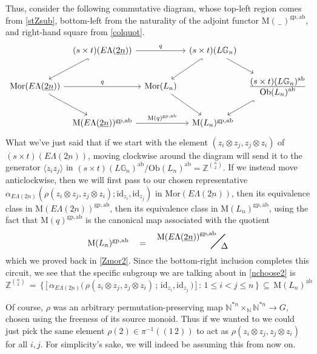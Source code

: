 \documentclass{amsbook} %
\newcommand{\bigquotient}[2]{ \raisebox{0.75\height}{$#1$} \mkern-12mu\scalebox{2}{$\diagup$}\mkern-10mu \raisebox{-0.5\height}{$#2$} }
\newcommand{\ELnn}{E\Lambda(\underline{2n})}
\numberwithin{section}{chapter}
\begin{document}
Thus, consider the following commutative diagram, whose top-left region comes from \cref{stZsub}, bottom-left from the naturality of the adjoint functor $\mathrm{M}( \, \_ \, )^{\mathrm{gp},\mathrm{ab}}$, and right-hand square from \cref{colquot}.
\[ \begin{tikzcd}[column sep=tiny] 
& (s \times t)(\ELnn) \ar[dl, hookrightarrow] \ar[rr, "q"] & & (s \times t)(L\mathbb{G}_{n}) \ar[dl, hookrightarrow] \ar[dr] & \\
\mathrm{Mor}(\ELnn) \ar[rr, "q"] \ar[dr] & & \mathrm{Mor}(L_n) \ar[dr] & & \frac{\displaystyle (s \times t)(L\mathbb{G}_{n})^{\mathrm{ab}}}{\displaystyle \mathrm{Ob}(L_n)^{\mathrm{ab}}} \ar[dl, hookrightarrow] \\
& \mathrm{M}(\ELnn)^{\mathrm{gp},\mathrm{ab}} \ar[rr, "\mathrm{M}(q)^{\mathrm{gp},\mathrm{ab}}"] & & \mathrm{M}(L_n)^{\mathrm{gp},\mathrm{ab}}
\end{tikzcd} \]
What we've just said that if we start with the element $(z_i \otimes z_j, z_j \otimes z_i)$ of $(s \times t)(\ELnn)$, moving clockwise around the diagram will send it to the generator $\langle z_i z_j \rangle$ in ${(s \times t)}(L\mathbb{G}_{n})^{\mathrm{ab}}/\mathrm{Ob}(L_n)^{\mathrm{ab}} = \mathbb{Z}^{{n}\choose{2}}$. If we instead move anticlockwise, then we will first pass to our chosen representative $\alpha_{\ELnn}(\rho(z_i \otimes z_j, z_j \otimes z_i); \mathrm{id}_{z_i}, \mathrm{id}_{z_j})$ in $\mathrm{Mor}(\ELnn)$, then its equivalence class in $\mathrm{M}(\ELnn)^{\mathrm{gp},\mathrm{ab}}$, then its equivalence class in $\mathrm{M}(L_n)^{\mathrm{gp},\mathrm{ab}}$, using the fact that $\mathrm{M}(q)^{\mathrm{gp},\mathrm{ab}}$ is the canonical map associated with the quotient
\[ \mathrm{M}(L_n)^{\mathrm{gp, ab}} \quad = \quad \bigquotient{{\mathrm{M}(\ELnn)}^{\mathrm{gp, ab}}}{\Delta} \]
which we proved back in \cref{Zmor2}. Since the bottom-right inclusion completes this circuit, we see that the specific subgroup we are talking about in \cref{nchoose2} is
\[ \mathbb{Z}^{{n}\choose{2}} \, = \, \big\{ \, \big[ \, \alpha_{\ELnn}\big( \, \rho(z_i \otimes z_j, z_j \otimes z_i) \, ; \,  \mathrm{id}_{z_i}, \mathrm{id}_{z_j} \, \big) \, \big] \, : \, 1 \le i < j \le n \, \big\} \, \subseteq \, \mathrm{M}(L_n)^{\mathrm{ab}}\]

Of course, $\rho$ was an arbitrary permutation-preserving map $\mathbb{N}^{\ast n} \times_{\mathbb{N}} \mathbb{N}^{\ast n} \to G$, chosen using the freeness of its source monoid. Thus if we wanted to we could just pick the same element $\rho(2) \in \pi^{-1}((1 \, 2))$ to act as $\rho(z_i \otimes z_j, z_j \otimes z_i)$ for all $i, j$. For simplicity's sake, we will indeed be assuming this from now on.
\end{document}
